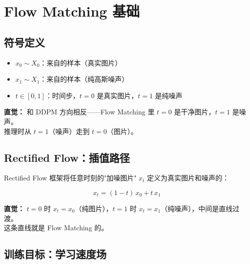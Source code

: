 
\section{Flow Matching 基础}

\subsection{符号定义}

\begin{conceptbox}
\begin{itemize}[leftmargin=1.5em]
  \item $x_0 \sim X_0$：来自的样本（真实图片）
  \item $x_1 \sim X_1$：来自的样本（纯高斯噪声）
  \item $t \in [0, 1]$：时间步，$t=0$ 是真实图片，$t=1$ 是纯噪声
\end{itemize}
\end{conceptbox}

\begin{intubox}
\textbf{直觉：} 和 DDPM 方向相反——Flow Matching 里 $t=0$ 是干净图片，$t=1$ 是噪声。\\
推理时从 $t=1$（噪声）走到 $t=0$（图片）。
\end{intubox}

\subsection{Rectified Flow：插值路径}

Rectified Flow 框架将任意时刻的"加噪图片" $x_t$ 定义为真实图片和噪声的：

\[
x_t = (1 - t)\, x_0 + t\, x_1 \tag{1}
\]

\begin{intubox}
\textbf{直觉：} $t=0$ 时 $x_t = x_0$（纯图片），$t=1$ 时 $x_t = x_1$（纯噪声），中间是直线过渡。\\
这条直线就是 Flow Matching 的。
\end{intubox}

\subsection{训练目标：学习速度场}


